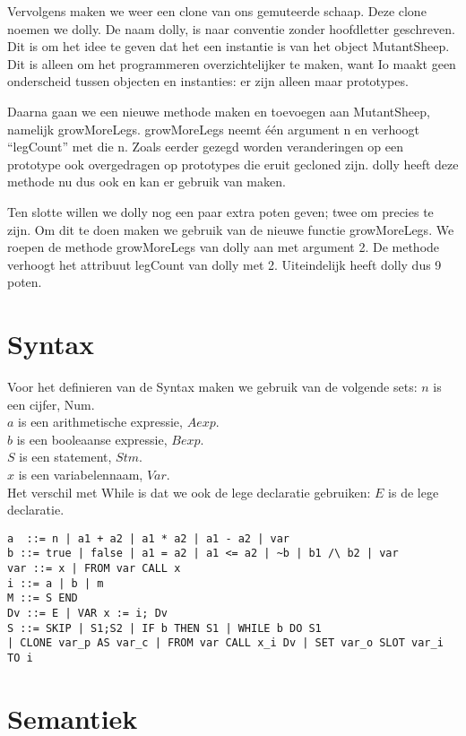 \documentclass[12pt]{article}
\begin{document}
Vervolgens maken we weer een clone van ons gemuteerde schaap. Deze clone noemen we dolly. De naam dolly, is naar conventie zonder hoofdletter geschreven.
Dit is om het idee te geven dat het een instantie is van het object MutantSheep.
Dit is alleen om het programmeren overzichtelijker te maken, want Io maakt geen onderscheid tussen objecten en instanties: er zijn alleen maar prototypes.\newline


Daarna gaan we een nieuwe methode maken en toevoegen aan MutantSheep, namelijk growMoreLegs.
growMoreLegs neemt \'e\'en argument n en verhoogt ``legCount'' met die n. Zoals eerder gezegd worden veranderingen op een prototype ook overgedragen op prototypes die eruit gecloned zijn. dolly heeft deze methode nu dus ook en kan er gebruik van maken.\newline

Ten slotte willen we dolly nog een paar extra poten geven; twee om precies te zijn.
Om dit te doen maken we gebruik van de nieuwe functie growMoreLegs.
We roepen de methode growMoreLegs van dolly aan met argument 2.
De methode verhoogt het attribuut legCount van dolly met 2.
Uiteindelijk heeft dolly dus 9 poten.

\pagebreak
\section{Syntax}
Voor het definieren van de Syntax maken we gebruik van de volgende sets:
$n$ is een cijfer, Num. \\
$a$ is een arithmetische expressie, $Aexp$. \\
$b$ is een booleaanse expressie, $Bexp$. \\
$S$ is een statement, $Stm$. \\
$x$ is een variabelennaam, $Var$. \\

Het verschil met While is dat we ook de lege declaratie gebruiken:
$E$ is de lege declaratie.

\begin{lstlisting}
a  ::= n | a1 + a2 | a1 * a2 | a1 - a2 | var
b ::= true | false | a1 = a2 | a1 <= a2 | ~b | b1 /\ b2 | var 
var ::= x | FROM var CALL x
i ::= a | b | m
M ::= S END 
Dv ::= E | VAR x := i; Dv
S ::= SKIP | S1;S2 | IF b THEN S1 | WHILE b DO S1
| CLONE var_p AS var_c | FROM var CALL x_i Dv | SET var_o SLOT var_i TO i
\end{lstlisting}

\pagebreak
\section{Semantiek}
\end{document}
